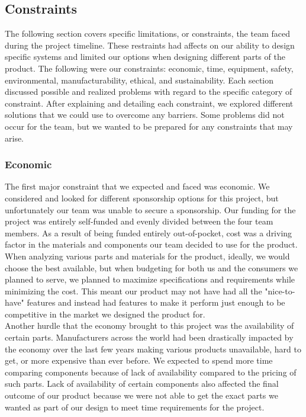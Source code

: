 \subsection{Constraints}
The following section covers specific limitations, or constraints, the team faced during the project timeline. These restraints had affects on our ability to design specific systems and limited our options when designing different parts of the product. The following were our constraints: economic, time, equipment, safety, environmental, manufacturability, ethical, and sustainability. Each section discussed possible and realized problems with regard to the specific category of constraint. After explaining and detailing each constraint, we explored different solutions that we could use to overcome any barriers. Some problems did not occur for the team, but we wanted to be prepared for any constraints that may arise.
\subsubsection{Economic}
The first major constraint that we expected and faced was economic. We considered and looked for different sponsorship options for this project, but unfortunately our team was unable to secure a sponsorship. Our funding for the project was entirely self-funded and evenly divided between the four team members. As a result of being funded entirely out-of-pocket, cost was a driving factor in the materials and components our team decided to use for the product. When analyzing various parts and materials for the product, ideally, we would choose the best available, but when budgeting for both us and the consumers we planned to serve, we planned to maximize specifications and requirements while minimizing the cost. This meant our product may not have had all the "nice-to-have" features and instead had features to make it perform just enough to be competitive in the market we designed the product for.\\

Another hurdle that the economy brought to this project was the availability of certain parts. Manufacturers across the world had been drastically impacted by the economy over the last few years making various products unavailable, hard to get, or more expensive than ever before. We expected to spend more time comparing components because of lack of availability compared to the pricing of such parts. Lack of availability of certain components also affected the final outcome of our product because we were not able to get the exact parts we wanted as part of our design to meet time requirements for the project.\\

